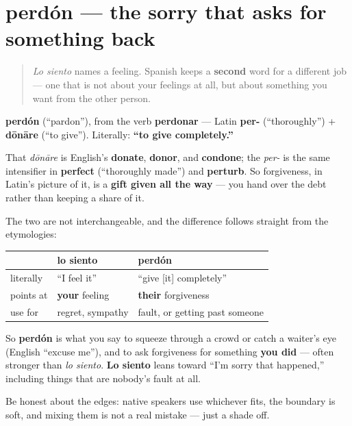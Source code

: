 \section[perdón]{perdón — the sorry that asks for something back}

\label{lesson:ES-C20-perdon}



\begin{quote}
\emph{Lo siento} names a feeling. Spanish keeps a \textbf{second} word for a different job — one that is not about your feelings at all, but about something you want from the other person.
\end{quote}

\begin{cousinweb}
\textbf{perdón} (\textquotedblleft{}pardon\textquotedblright{}), from the verb \textbf{perdonar} — Latin \textbf{per-} (\textquotedblleft{}thoroughly\textquotedblright{}) + \textbf{dōnāre} (\textquotedblleft{}to give\textquotedblright{}). Literally: \textbf{\textquotedblleft{}to give completely.\textquotedblright{}}

That \emph{dōnāre} is English's \textbf{donate}, \textbf{donor}, and \textbf{condone}; the \emph{per-} is the same intensifier in \textbf{perfect} (\textquotedblleft{}thoroughly made\textquotedblright{}) and \textbf{perturb}. So forgiveness, in Latin's picture of it, is a \textbf{gift given all the way} — you hand over the debt rather than keeping a share of it.
\end{cousinweb}

\begin{culture}
The two are not interchangeable, and the difference follows straight from the etymologies:

\noindent
\begin{tabularx}{\linewidth}{@{}>{\raggedright\arraybackslash}X>{\raggedright\arraybackslash}X>{\raggedright\arraybackslash}X@{}}
\toprule
\textbf{} & \textbf{\textbf{lo siento}} & \textbf{\textbf{perdón}} \\
\midrule
literally & \textquotedblleft{}I feel it\textquotedblright{} & \textquotedblleft{}give {[}it{]} completely\textquotedblright{} \\
points at & \textbf{your} feeling & \textbf{their} forgiveness \\
use for & regret, sympathy & fault, or getting past someone \\
\bottomrule
\end{tabularx}

So \textbf{perdón} is what you say to squeeze through a crowd or catch a waiter's eye (English \textquotedblleft{}excuse me\textquotedblright{}), and to ask forgiveness for something \textbf{you did} — often stronger than \emph{lo siento}. \textbf{Lo siento} leans toward \textquotedblleft{}I'm sorry that happened,\textquotedblright{} including things that are nobody's fault at all.

Be honest about the edges: native speakers use whichever fits, the boundary is soft, and mixing them is not a real mistake — just a shade off.
\end{culture}

